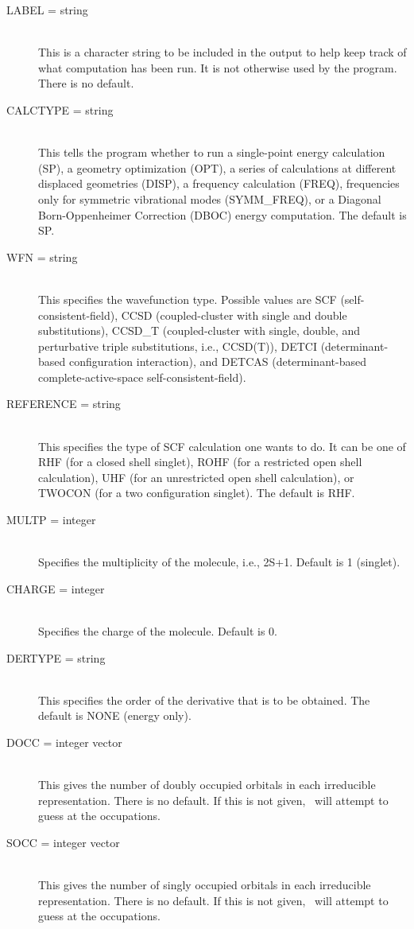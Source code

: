 \begin{description}
\item[LABEL = string]\mbox{}\\
This is a character string to be included in the output to help keep track
of what computation has been run.  It is not otherwise used by the program.
There is no default.
\item[CALCTYPE = string]\mbox{}\\
This tells the program whether to run a single-point energy calculation
(SP), a geometry optimization (OPT), a series of calculations at 
different displaced geometries (DISP), a frequency calculation (FREQ),
frequencies only for symmetric vibrational modes (SYMM\_FREQ), 
or a Diagonal Born-Oppenheimer Correction (DBOC) energy computation.
The default is SP.
\item[WFN = string]\mbox{}\\
This specifies the wavefunction type.  Possible values are SCF
(self-consistent-field), CCSD (coupled-cluster with single and double
substitutions), CCSD\_T (coupled-cluster with single, double, and 
perturbative triple substitutions, i.e., CCSD(T)), 
DETCI (determinant-based configuration interaction), and
DETCAS (determinant-based complete-active-space self-consistent-field). 
\item[REFERENCE = string]\mbox{}\\
This specifies the type of SCF calculation one wants to do.  It
can be one of RHF (for a closed  shell  singlet), ROHF (for
a restricted open shell calculation), UHF (for an unrestricted
open shell calculation), or TWOCON (for a two configuration
singlet).  The default is RHF.
\item[MULTP = integer]\mbox{}\\
Specifies the multiplicity of the molecule, i.e., 2S+1.  Default
is 1 (singlet).
\item[CHARGE = integer]\mbox{}\\
Specifies the charge of the molecule.  Default is 0.
\item[DERTYPE = string]\mbox{}\\
This specifies the order of the derivative that is to be obtained.
The default is NONE (energy only).
\item[DOCC = integer vector]\mbox{}\\
This gives the number of doubly occupied orbitals in each irreducible
representation.  There is no default.  If this is not given, 
\PSIcscf\  will attempt to guess at the occupations.
\item[SOCC = integer vector]\mbox{} \\
This gives the number of singly occupied orbitals in each irreducible 
representation. There is no default.  If this is not given,
\PSIcscf\ will attempt to guess at the occupations.
\end{description}

